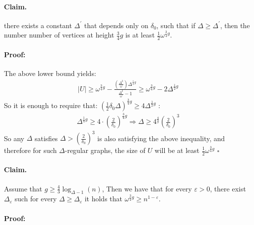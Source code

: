 \documentclass{article}
\begin{document}
\begin{multicols*}{2}
\paragraph{Claim.} there exists a constant $\Delta^{\prime}$ that depends only on $\delta_{0}$, such that if $\Delta \ge \Delta^{\prime}$, then the number number of vertices at height $\frac{3}{4}g$ is at least $ \frac{1}{2}\omega^{\frac{3}{4}g} $.

\paragraph{Proof:} The above lower bound yields: 
\begin{equation*}
  \begin{split}
    |U| \ge \omega^{\frac{3}{4}g} -  \frac{\left( \frac{\Delta^{2}}{\omega} \right)\Delta^{\frac{1}{2}g}  }{\frac{\Delta^{2}}{\omega}-1} \ge \omega^{\frac{3}{4}g} -  2 \Delta^{\frac{1}{2}g}  
  \end{split}
\end{equation*}
So it is enough to require that: $\left( \frac{1}{2}\delta_{0}\Delta  \right)^{\frac{3}{4}g} \ge 4 \Delta^{\frac{1}{2}g}$ :  
\begin{equation*}
  \begin{split}
    \Delta^{\frac{1}{4}g}\ge 4\cdot \left( \frac{2}{\delta_{0}} \right)^{\frac{3}{4}g} \Rightarrow\Delta \ge  4^{\frac{4}{g}} \left( \frac{2}{\delta_{0}} \right)^{3} 
  \end{split}
\end{equation*} So any $\Delta$ satisfies $\Delta> \left( \frac{2}{\delta_0} \right)^{3}$ is also satisfying the above inequality, and therefore for such $\Delta$-regular graphs, the size of $U$ will be at least $\frac{1}{2}\omega^{\frac{3}{4}g}$ $\square$   

\paragraph{Claim.} Assume that $ g \ge \frac{4}{3} \log_{\Delta -1 }\left( n \right) $, Then we have that for every $\varepsilon >0 $,  there exist $\Delta_{\varepsilon}$  such for every $\Delta \ge \Delta_{\varepsilon}$  it holds that $ \omega^{\frac{3}{4}g} \ge n^{1-\varepsilon}$.
\paragraph{Proof:}


\end{multicols*}
\end{document}
